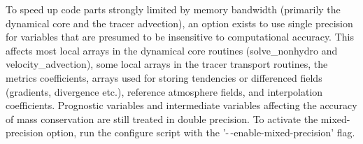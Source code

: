 To speed up code parts strongly limited by memory bandwidth (primarily the dynamical core and the tracer advection), 
an option exists to use single precision for variables that are presumed to be insensitive to computational accuracy.
This affects most local arrays in the dynamical core routines (solve\_nonhydro and velocity\_advection), some local
arrays in the tracer transport routines, the metrics coefficients,
arrays used for storing tendencies or differenced fields (gradients, divergence etc.), reference atmosphere fields,
and interpolation coefficients. Prognostic variables and intermediate variables affecting the accuracy of mass conservation
are still treated in double precision. To activate the mixed-precision option, run the configure script with the 
'-\,-enable-mixed-precision' flag.




